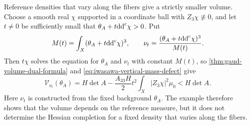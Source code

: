 Reference densities that vary along the fibers give a strictly smaller volume. Choose a smooth real $\chi$ supported in a coordinate ball with $Z_3\chi\not\equiv0$, and let $t\ne0$ be sufficiently small that $\theta_A+t\mathrm{dd}^{\mathrm{c}}\chi>0$. Put
\[
 M(t)=\int_X(\theta_A+t\mathrm{dd}^{\mathrm{c}}\chi)^3,
 \qquad\nu_t=\frac{(\theta_A+t\mathrm{dd}^{\mathrm{c}}\chi)^3}{M(t)}.
\]
Then $t\chi$ solves the equation for $\theta_A$ and $\nu_t$ with constant $M(t)$, so \cref{thm:gaud-volume-dual-formula} and \eqref{eq:iwasawa-vertical-mass-defect} give
\[
 \mathcal V_{\nu_t}(\theta_A)
 =H\det A-\frac{A_{33}H}{2}t^2\int_X|Z_3\chi|^2\mu_0
 <H\det A.
\]
Here $\nu_t$ is constructed from the fixed background $\theta_A$. The example therefore shows that the volume depends on the reference measure, but it does not determine the Hessian completion for a fixed density that varies along the fibers.
